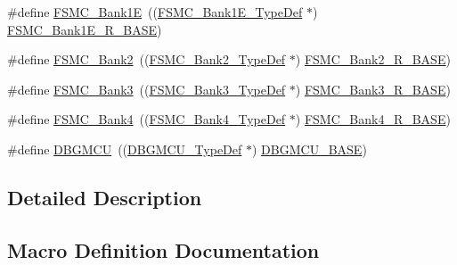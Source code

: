 \begin{DoxyCompactItemize}
\item 
\#define \mbox{\hyperlink{group___peripheral__declaration_ga422986101f42a8811ae89ac69deb2759}{F\+S\+M\+C\+\_\+\+Bank1E}}~((\mbox{\hyperlink{struct_f_s_m_c___bank1_e___type_def}{F\+S\+M\+C\+\_\+\+Bank1\+E\+\_\+\+Type\+Def}} $\ast$) \mbox{\hyperlink{group___peripheral__memory__map_gaea182589c84aee30b7f735474d8774e2}{F\+S\+M\+C\+\_\+\+Bank1\+E\+\_\+\+R\+\_\+\+B\+A\+SE}})
\item 
\#define \mbox{\hyperlink{group___peripheral__declaration_gabb3dfb5e88694aa2983ecabd33a55e0a}{F\+S\+M\+C\+\_\+\+Bank2}}~((\mbox{\hyperlink{struct_f_s_m_c___bank2___type_def}{F\+S\+M\+C\+\_\+\+Bank2\+\_\+\+Type\+Def}} $\ast$) \mbox{\hyperlink{group___peripheral__memory__map_ga3cb46d62f4f6458e186a5a4c753e4918}{F\+S\+M\+C\+\_\+\+Bank2\+\_\+\+R\+\_\+\+B\+A\+SE}})
\item 
\#define \mbox{\hyperlink{group___peripheral__declaration_ga411eedc00b5b2b22b494004d4f41b736}{F\+S\+M\+C\+\_\+\+Bank3}}~((\mbox{\hyperlink{struct_f_s_m_c___bank3___type_def}{F\+S\+M\+C\+\_\+\+Bank3\+\_\+\+Type\+Def}} $\ast$) \mbox{\hyperlink{group___peripheral__memory__map_gacf056152c9e5aefcc67db78d1302c0d7}{F\+S\+M\+C\+\_\+\+Bank3\+\_\+\+R\+\_\+\+B\+A\+SE}})
\item 
\#define \mbox{\hyperlink{group___peripheral__declaration_ga5aa00e4ac522693c6a21bc23ef5a96df}{F\+S\+M\+C\+\_\+\+Bank4}}~((\mbox{\hyperlink{struct_f_s_m_c___bank4___type_def}{F\+S\+M\+C\+\_\+\+Bank4\+\_\+\+Type\+Def}} $\ast$) \mbox{\hyperlink{group___peripheral__memory__map_gaf9e5417133160b0bdd0498d982acec19}{F\+S\+M\+C\+\_\+\+Bank4\+\_\+\+R\+\_\+\+B\+A\+SE}})
\item 
\#define \mbox{\hyperlink{group___peripheral__declaration_ga92ec6d9ec2251fda7d4ce09748cd74b4}{D\+B\+G\+M\+CU}}~((\mbox{\hyperlink{struct_d_b_g_m_c_u___type_def}{D\+B\+G\+M\+C\+U\+\_\+\+Type\+Def}} $\ast$) \mbox{\hyperlink{group___peripheral__memory__map_ga4adaf4fd82ccc3a538f1f27a70cdbbef}{D\+B\+G\+M\+C\+U\+\_\+\+B\+A\+SE}})
\end{DoxyCompactItemize}


\subsection{Detailed Description}


\subsection{Macro Definition Documentation}
\mbox{\label{group___peripheral__declaration_ga90d2d5c526ce5c0a551f533eccbee71a}} 

